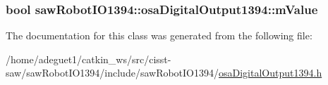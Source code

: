 \hypertarget{classsaw_robot_i_o1394_1_1osa_digital_output1394_adc490ea266adfe912fd65778494f4787}{
\subsubsection[{m\-Value}]{\setlength{\rightskip}{0pt plus 5cm}bool saw\-Robot\-I\-O1394\-::osa\-Digital\-Output1394\-::m\-Value\hspace{0.3cm}{\ttfamily [protected]}}}\label{classsaw_robot_i_o1394_1_1osa_digital_output1394_adc490ea266adfe912fd65778494f4787}


The documentation for this class was generated from the following file\-:\begin{DoxyCompactItemize}
\item 
/home/adeguet1/catkin\-\_\-ws/src/cisst-\/saw/saw\-Robot\-I\-O1394/include/saw\-Robot\-I\-O1394/\hyperlink{osa_digital_output1394_8h}{osa\-Digital\-Output1394.\-h}\end{DoxyCompactItemize}
